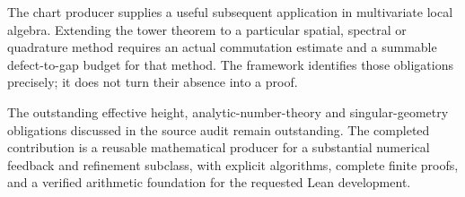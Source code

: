 The chart producer supplies a useful subsequent application in
multivariate local algebra. Extending the tower theorem to a
particular spatial, spectral or quadrature method requires an
actual commutation estimate and a summable defect-to-gap budget
for that method. The framework identifies those obligations
precisely; it does not turn their absence into a proof.

The outstanding effective height, analytic-number-theory and
singular-geometry obligations discussed in the source audit remain
outstanding. The completed contribution is a reusable mathematical
producer for a substantial numerical feedback and refinement
subclass, with explicit algorithms, complete finite proofs, and a
verified arithmetic foundation for the requested Lean development.
